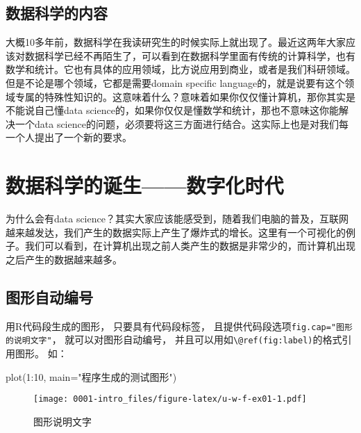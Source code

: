 \documentclass[
  oneside]{book}
\newenvironment{Shaded}{\begin{snugshade}}{\end{snugshade}}
\newcommand{\AttributeTok}[1]{\textcolor[rgb]{0.77,0.63,0.00}{#1}}
\newcommand{\DecValTok}[1]{\textcolor[rgb]{0.00,0.00,0.81}{#1}}
\newcommand{\FunctionTok}[1]{\textcolor[rgb]{0.00,0.00,0.00}{#1}}
\newcommand{\NormalTok}[1]{#1}
\newcommand{\SpecialCharTok}[1]{\textcolor[rgb]{0.00,0.00,0.00}{#1}}
\newcommand{\StringTok}[1]{\textcolor[rgb]{0.31,0.60,0.02}{#1}}
\theoremstyle{definition}
\theoremstyle{definition}
\theoremstyle{definition}
\theoremstyle{definition}
\theoremstyle{remark}
\begin{document}
\hypertarget{1-data-science-content}{%
\subsection{数据科学的内容}\label{1-data-science-content}}

大概10多年前，数据科学在我读研究生的时候实际上就出现了。最近这两年大家应该对数据科学已经不再陌生了，可以看到在数据科学里面有传统的计算科学，也有数学和统计。它也有具体的应用领域，比方说应用到商业，或者是我们科研领域。但是不论是哪个领域，它都是需要domain
specific
language的，就是说要有这个领域专属的特殊性知识的。这意味着什么？意味着如果你仅仅懂计算机，那你其实是不能说自己懂data
science的，如果你仅仅是懂数学和统计，那也不意味这你能解决一个data
science的问题，必须要将这三方面进行结合。这实际上也是对我们每一个人提出了一个新的要求。

\hypertarget{1-data-science-born}{%
\section{数据科学的诞生------数字化时代}\label{1-data-science-born}}

为什么会有data science？其实大家应该能感受到，随着我们电脑的普及，互联网越来越发达，我们产生的数据实际上产生了爆炸式的增长。这里有一个可视化的例子。我们可以看到，在计算机出现之前人类产生的数据是非常少的，而计算机出现之后产生的数据越来越多。

\hypertarget{usage-writing-fig}{%
\subsection{图形自动编号}\label{usage-writing-fig}}

用R代码段生成的图形， 只要具有代码段标签，
且提供代码段选项\texttt{fig.cap="图形的说明文字"}， 就可以对图形自动编号，
并且可以用如\texttt{\textbackslash{}@ref(fig:label)}的格式引用图形。 如：

\begin{Shaded}
\begin{Highlighting}[]
\FunctionTok{plot}\NormalTok{(}\DecValTok{1}\SpecialCharTok{:}\DecValTok{10}\NormalTok{, }\AttributeTok{main=}\StringTok{"程序生成的测试图形"}\NormalTok{)}
\end{Highlighting}
\end{Shaded}

\begin{figure}
\centering
\texttt{[image: 0001-intro\_files/figure-latex/u-w-f-ex01-1.pdf]}
\caption{\label{fig:u-w-f-ex01}图形说明文字}
\end{figure}
\end{document}
